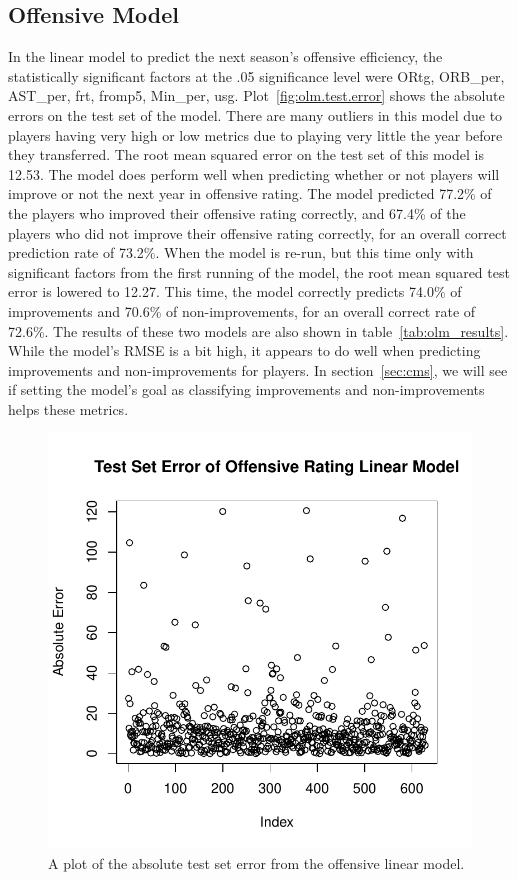 \documentclass[12pt]{article}
\begin{document}
\subsection{Offensive Model}
\label{subsec:olm}
In the linear model to predict the next season's offensive efficiency, the statistically significant factors at the .05 significance level were ORtg, ORB\_per, AST\_per, frt, fromp5, Min_per, usg. Plot~\ref{fig:olm.test.error} shows the absolute errors on the test set of the model. There are many outliers in this model due to players having very high or low metrics due to playing very little the year before they transferred. The root mean squared error on the test set of this model is 12.53. The model does perform well when predicting whether or not players will improve or not the next year in offensive rating. The model predicted 77.2\% of the players who improved their offensive rating correctly, and 67.4\% of the players who did not improve their offensive rating correctly, for an overall correct prediction rate of 73.2\%. When the model is re-run, but this time only with significant factors from the first running of the model, the root mean squared test error is lowered to 12.27. This time, the model correctly predicts 74.0\% of improvements and 70.6\% of non-improvements, for an overall correct rate of 72.6\%. The results of these two models are also shown in table~\ref{tab:olm_results}. While the model's RMSE is a bit high, it appears to do well when predicting improvements and non-improvements for players. In section~\ref{sec:cms}, we will see if setting the model's goal as classifying improvements and non-improvements helps these metrics.

\begin{figure}[tbp]
	\centering
	\includegraphics[width=\textwidth]{olm.test.error}
	\caption{A plot of the absolute test set error from the offensive linear model.}
	\label{fig:olm.test.errort}
\end{figure}
\end{document}
